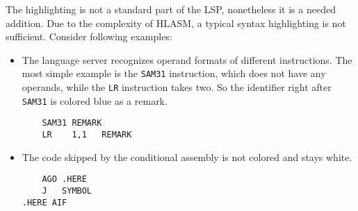 The highlighting is not a standard part of the LSP, nonetheless it is a needed addition. Due to the complexity of HLASM, a typical syntax highlighting is not sufficient. Consider following examples:

\begin{itemize}
    \item The language server recognizes operand formats of different instructions. The most simple example is the \texttt{SAM31} instruction, which does not have any operands, while the \texttt{LR} instruction takes two. So the identifier right after \texttt{SAM31} is colored blue as a remark. 
    
\begin{lstlisting}
    SAM31 REMARK
    LR    1,1   REMARK
\end{lstlisting}

\item The code skipped by the conditional assembly is not colored and stays white.
\begin{lstlisting}
    AGO .HERE
    J   SYMBOL
.HERE AIF
\end{lstlisting}

\end{itemize}

